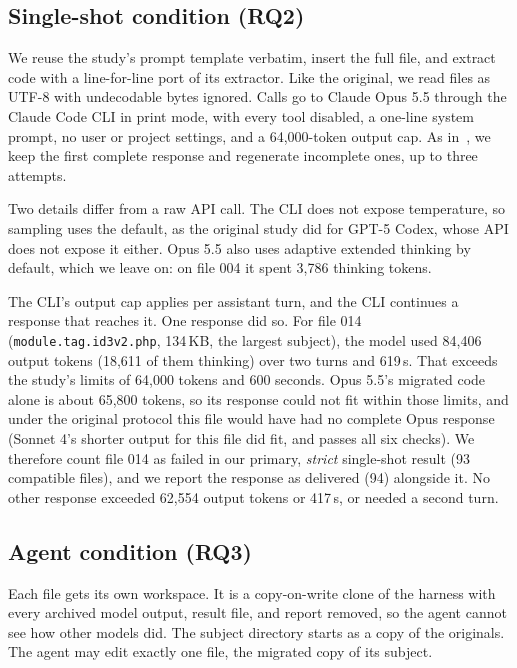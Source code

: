 \documentclass[11pt]{article}
\newcommand{\code}[1]{\texttt{#1}}
\begin{document}
\subsection{Single-shot condition (RQ2)}

We reuse the study's prompt template verbatim, insert the full file, and extract code with a line-for-line port of its extractor.
Like the original, we read files as UTF-8 with undecodable bytes ignored.
Calls go to Claude Opus 5.5 through the Claude Code CLI in print mode, with every tool disabled, a one-line system prompt, no user or project settings, and a 64,000-token output cap.
As in~\cite{mahmud2026modernization}, we keep the first complete response and regenerate incomplete ones, up to three attempts.

Two details differ from a raw API call.
The CLI does not expose temperature, so sampling uses the default, as the original study did for GPT-5 Codex, whose API does not expose it either.
Opus 5.5 also uses adaptive extended thinking by default, which we leave on: on file 004 it spent 3,786 thinking tokens.

The CLI's output cap applies per assistant turn, and the CLI continues a response that reaches it.
One response did so.
For file 014 (\code{module.tag.id3v2.php}, 134\,KB, the largest subject), the model used 84,406 output tokens (18,611 of them thinking) over two turns and 619\,s.
That exceeds the study's limits of 64,000 tokens and 600 seconds.
Opus 5.5's migrated code alone is about 65,800 tokens, so its response could not fit within those limits, and under the original protocol this file would have had no complete Opus response (Sonnet 4's shorter output for this file did fit, and passes all six checks).
We therefore count file 014 as failed in our primary, \emph{strict} single-shot result (93 compatible files), and we report the response as delivered (94) alongside it.
No other response exceeded 62,554 output tokens or 417\,s, or needed a second turn.

\subsection{Agent condition (RQ3)}

Each file gets its own workspace.
It is a copy-on-write clone of the harness with every archived model output, result file, and report removed, so the agent cannot see how other models did.
The subject directory starts as a copy of the originals.
The agent may edit exactly one file, the migrated copy of its subject.
\end{document}
